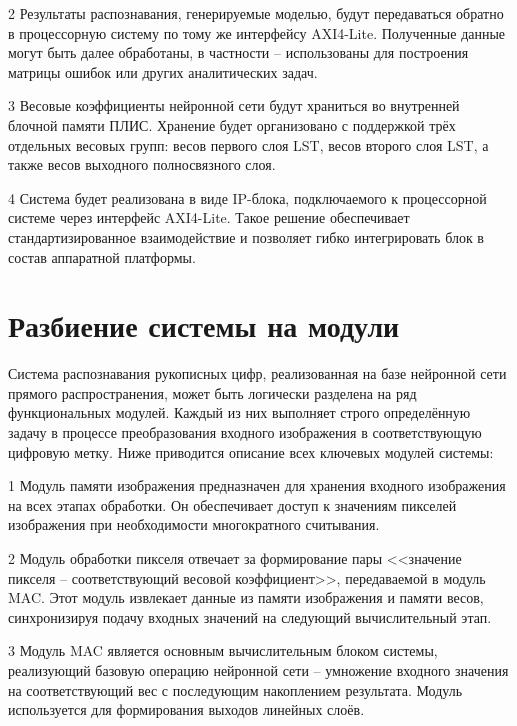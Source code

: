   2 Результаты распознавания, генерируемые моделью, будут передаваться обратно 
в процессорную систему по тому же интерфейсу AXI4-Lite. Полученные данные могут 
быть далее обработаны, в частности – использованы для построения матрицы ошибок 
или других аналитических задач.
  
  3 Весовые коэффициенты нейронной сети будут храниться во внутренней блочной 
памяти ПЛИС. Хранение будет организовано с поддержкой трёх отдельных весовых 
групп: весов первого слоя LST, весов второго слоя LST, а также весов выходного 
полносвязного слоя.
  
  4 Система будет реализована в виде IP-блока, подключаемого к процессорной 
системе через интерфейс AXI4-Lite. Такое решение обеспечивает 
стандартизированное взаимодействие и позволяет гибко интегрировать блок в 
состав аппаратной платформы.

\section{Разбиение системы на модули}\par
\hspace*{12.5 mm}Система распознавания рукописных цифр, реализованная на базе 
нейронной сети прямого распространения, может быть логически разделена на ряд 
функциональных модулей. Каждый из них выполняет строго определённую задачу в 
процессе преобразования входного изображения в соответствующую цифровую метку. 
Ниже приводится описание всех ключевых модулей системы:

  1 Модуль памяти изображения предназначен для хранения входного изображения на 
всех этапах обработки. Он обеспечивает доступ к значениям пикселей изображения 
при необходимости многократного считывания.

  2 Модуль обработки пикселя отвечает за формирование пары <<значение пикселя 
– соответствующий весовой коэффициент>>, передаваемой в модуль MAC. Этот модуль 
извлекает данные из памяти изображения и памяти весов, синхронизируя подачу 
входных значений на следующий вычислительный этап.
  
  3 Модуль MAC является основным вычислительным блоком системы, реализующий 
базовую операцию нейронной сети – умножение входного значения на соответствующий 
вес с последующим накоплением результата. Модуль используется для формирования 
выходов линейных слоёв.

